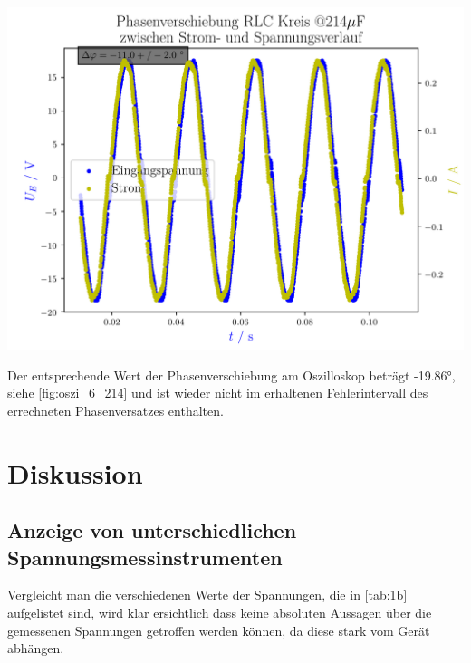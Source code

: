 \documentclass[11pt,ngerman]{scrartcl}
\begin{document}
\begin{center}
	\begin{minipage}[t]{0.8\textwidth}
		\includegraphics[width=\textwidth]{./figures/phaseleistung/Versuch6/phaseshiftrlc20.png}
		\label{fig:phaseshiftrlc20}
	\end{minipage}
\end{center}

Der entsprechende Wert der Phasenverschiebung am Oszilloskop beträgt -19.86°, siehe \autoref{fig:oszi_6_214} und ist wieder nicht im erhaltenen Fehlerintervall des errechneten Phasenversatzes enthalten.




\section{Diskussion}\label{disk}


\subsection{Anzeige von unterschiedlichen Spannungsmessinstrumenten}

Vergleicht man die verschiedenen Werte der Spannungen, die in \autoref{tab:1b} aufgelistet sind, wird klar ersichtlich dass keine absoluten Aussagen über die gemessenen Spannungen getroffen werden können, da diese stark vom Gerät abhängen.

\vspace{2mm}
\end{document}

